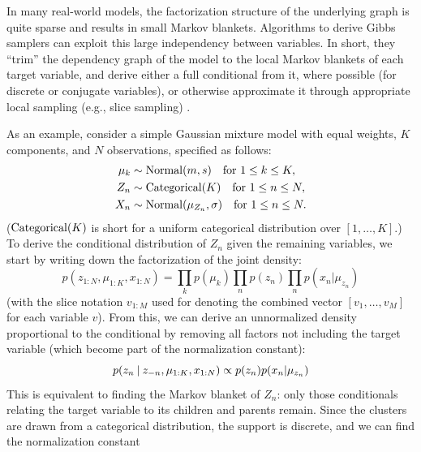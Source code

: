 In many real-world models, the factorization structure of the underlying graph is quite sparse and
results in small Markov blankets.  Algorithms to derive Gibbs samplers can exploit this large
independency between variables.  In short, they \enquote{trim} the dependency graph of the model to
the local Markov blankets of each target variable, and derive either a full conditional from it,
where possible (for discrete or conjugate variables), or otherwise approximate it through
appropriate local sampling (e.g., slice sampling) \parencite[see][]{plummer2003jags}.

As an example, consider a simple Gaussian mixture model with equal weights, \(K\) components, and
\(N\) observations, specified as follows:
\begin{equation}
  \label{eq:normal-mixture-1}
  \begin{aligned}
    \mu_{k} &\sim \mathrm{Normal}(m, s) \quad\text{for } 1 \le k \le K, \\
    Z_{n} &\sim \mathrm{Categorical}(K) \quad\text{for } 1 \le n \le N, \\
    X_{n} &\sim \mathrm{Normal}(\mu_{Z_{n}}, \sigma) \quad\text{for } 1 \le n \le N.
  \end{aligned}
\end{equation}
(\(\mathrm{Categorical}(K)\) is short for a uniform categorical distribution over
\([1, \ldots, K]\).)  To derive the conditional distribution of \(Z_{n}\) given the remaining
variables, we start by writing down the factorization of the joint density:
\begin{equation}
  p(z_{1:N}, \mu_{1:K}, x_{1:N}) = \prod_{k} p(\mu_{k}) \prod_{n} p(z_{n}) \prod_{n} p(x_{n} | \mu_{z_{n}})
\end{equation}
(with the slice notation \(v_{1:M}\) used for denoting the combined vector \([v_1, \ldots, v_M]\)
for each variable \(v\)). From this, we can derive an unnormalized density proportional to the
conditional by removing all factors not including the target variable (which become part of the
normalization constant):
\begin{equation}
    p(z_{n} \:\vert\: z_{-n}, \mu_{1:K}, x_{1:N}) \propto p(z_{n}) p(x_{n} | \mu_{z_{n}})
\end{equation}
This is equivalent to finding the Markov blanket \parencites[section
24.2]{murphy2012machine}[section 4.5]{koller2009probabilistic} of \(Z_{n}\): only those conditionals
relating the target variable to its children and parents remain.  Since the clusters are drawn from
a categorical distribution, the support is discrete, and we can find the normalization constant
